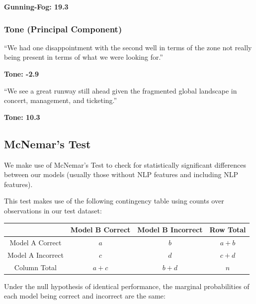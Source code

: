 \documentclass{article}[11pt]
\begin{document}
    \textbf{Gunning-Fog: 19.3}

    \subsubsection{Tone (Principal Component)}

    \begin{em}
        ``We had one disappointment with the second well in terms of the zone not really being present in terms of what we were looking for.''
    \end{em}

    \textbf{Tone: -2.9}

    \begin{em}
        ``We see a great runway still ahead given the fragmented global landscape in concert, management, and ticketing.''
    \end{em}

    \textbf{Tone: 10.3}

    \clearpage
    \newpage
    \subsection{McNemar's Test}

    \label{sec:mcnemars-test}

    We make use of McNemar's Test to check for statistically significant differences between our models (usually those without NLP features and including NLP features).

    This test makes use of the following contingency table using counts over observations in our test dataset:

    \begin{center}
        \begin{tabular}{|c|c|c|c|}
            \hline 
                & Model B Correct & Model B Incorrect & Row Total\tabularnewline
            \hline 
            \hline 
            Model A Correct & $a$ & $b$ & $a+b$\tabularnewline
            \hline 
            Model A Incorrect & $c$ & $d$ & $c+d$\tabularnewline
            \hline 
            Column Total & $a+c$ & $b+d$ & $n$\tabularnewline
            \hline 
        \end{tabular}
    \par\end{center}

    Under the null hypothesis of identical performance, the marginal probabilities of each model being correct and incorrect are the same: 
\end{document}
